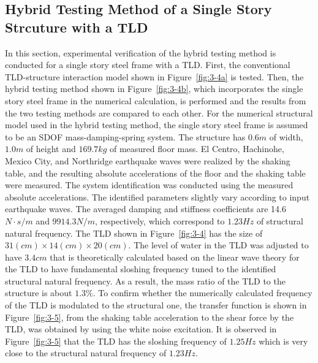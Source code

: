\clearpage
\subsection{Hybrid Testing Method of a Single Story Strcuture with a TLD}
In this section, experimental verification of the hybrid testing method is conducted for a single story steel frame with a TLD. First, the conventional TLD-structure interaction model shown in Figure~\ref{fig:3-4a} is tested. Then, the hybrid testing method shown in Figure~\ref{fig:3-4b}, which incorporates the single story steel frame in the numerical calculation, is performed and the results from the two testing methods are compared to each other.
For the numerical structural model used in the hybrid testing method, the single story steel frame is assumed to be an SDOF mass-damping-spring system. The structure has $0.6m$ of width, $1.0m$ of height and $169.7kg$ of measured floor mass. El Centro, Hachinohe, Mexico City, and Northridge earthquake waves were realized by the shaking table, and the resulting absolute accelerations of the floor and the shaking table were measured. The system identification was conducted using the measured absolute accelerations. The identified parameters slightly vary according to input earthquake waves. The averaged damping and stiffness coefficients are 14.6$N\cdot s/m$ and $9914.3N/m$, respectively, which correspond to $1.23Hz$ of structural natural frequency. The TLD shown in Figure~\ref{fig:3-4} has the size of $31(cm)\times14(cm)\times20(cm)$. The level of water in the TLD was adjusted to have $3.4cm$ that is theoretically calculated based on the linear wave theory\citep{soong1997passive} for the TLD to have fundamental sloshing frequency tuned to the identified structural natural frequency. As a result, the mass ratio of the TLD to the structure is about $1.3\%$. To confirm whether the numerically calculated frequency of the TLD is modulated to the structural one, the transfer function is shown in Figure~\ref{fig:3-5}, from the shaking table acceleration to the shear force by the TLD, was obtained by using the white noise excitation. It is observed in Figure~\ref{fig:3-5} that the TLD has the sloshing frequency of $1.25Hz$ which is very close to the structural natural frequency of $1.23Hz$.


